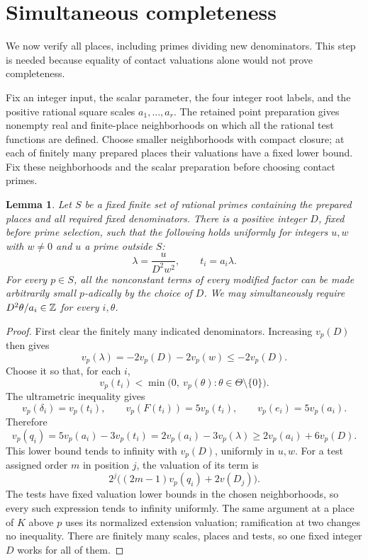 \documentclass[11pt,a4paper]{article}
\newtheorem{lemma}[theorem]{Lemma}
\theoremstyle{remark}\newtheorem{remark}[theorem]{Remark}
\begin{document}
\section{Simultaneous completeness}
We now verify all places, including primes dividing new denominators.
This step is needed because equality of contact valuations alone would
not prove completeness.

Fix an integer input, the scalar parameter, the four integer root labels,
and the positive rational square scales $a_1,\ldots,a_r$. The retained
point preparation gives nonempty real and finite-place neighborhoods
on which all the rational test functions are defined. Choose smaller
neighborhoods with compact closure; at each of finitely many prepared
places their valuations have a fixed lower bound. Fix these neighborhoods
and the scalar preparation before choosing contact primes.

\begin{lemma}\label{lem:finite}
Let $S$ be a fixed finite set of rational primes containing the prepared
places and all required fixed denominators. There is a positive integer
$D$, fixed before prime selection, such that the following holds uniformly
for integers $u,w$ with $w\ne0$ and $u$ a prime outside $S$:
\[
 \lambda=\frac{u}{D^2w^2},\qquad t_i=a_i\lambda.
\]
For every $p\in S$, all the nonconstant terms of every modified factor
can be made arbitrarily small $p$-adically by the choice of $D$.
We may simultaneously require $D^2\theta/a_i\in\mathbb Z$ for every $i,\theta$.
\end{lemma}
\begin{proof}
First clear the finitely many indicated denominators. Increasing $v_p(D)$
then gives
\[
 v_p(\lambda)=-2v_p(D)-2v_p(w)\le-2v_p(D).
\]
Choose it so that, for each $i$,
\[
 v_p(t_i)<\min\bigl(0,\ v_p(\theta):\theta\in\Theta\setminus\{0\}\bigr).
\]
The ultrametric inequality gives
\[
 v_p(\delta_i)=v_p(t_i),\qquad v_p(F(t_i))=5v_p(t_i),
 \qquad v_p(e_i)=5v_p(a_i).
\]
Therefore
\begin{equation}\label{eq:smallq}
 v_p(q_i)=5v_p(a_i)-3v_p(t_i)
          =2v_p(a_i)-3v_p(\lambda)
          \ge2v_p(a_i)+6v_p(D).
\end{equation}
This lower bound tends to infinity with $v_p(D)$, uniformly in $u,w$.
For a test assigned order $m$ in position $j$, the valuation of its term
is
\[
 2^j\bigl((2m-1)v_p(q_i)+2v(D_j)\bigr).
\]
The tests have fixed valuation lower bounds in the chosen neighborhoods,
so every such expression tends to infinity uniformly. The same argument
at a place of $K$ above $p$ uses its normalized extension valuation;
ramification at two changes no inequality. There are finitely many
scales, places and tests, so one fixed integer $D$ works for all of them.
\end{proof}
\end{document}
